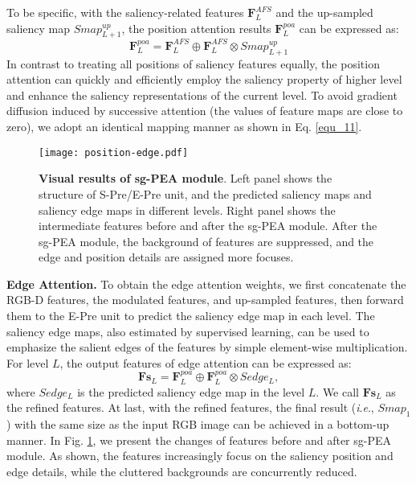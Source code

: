 \documentclass[runningheads]{llncs}
\newcommand{\ie}{\textit{i}.\textit{e}.}
\begin{document}
To be specific, with the saliency-related features $\mathbf{F}_{L}^{AFS}$ and the up-sampled saliency map $Smap_{L+1}^{up}$, the position attention results $\mathbf{F}_{L}^{poa}$ can be expressed as:
\begin{equation}
\label{equ_11}
\mathbf{F}_{L}^{poa} =\mathbf{F}_{L}^{AFS} \oplus \mathbf{F}_{L}^{AFS} \otimes Smap_{L+1}^{up}
\end{equation}
In contrast to treating all positions of saliency features equally, the position attention can quickly and efficiently employ the saliency property of higher level and enhance the  saliency representations of the current level. To avoid gradient diffusion induced by successive attention (the values of feature maps are close to zero), we adopt an identical mapping manner as shown in Eq. \eqref{equ_11}.

\begin{figure*}[!t]
	\centering
	\texttt{[image: position-edge.pdf]}
	\caption{\textbf{Visual results of sg-PEA module}. Left panel shows the structure of S-Pre/E-Pre unit, and the predicted saliency maps and saliency edge maps in different levels. Right panel shows the intermediate features before and after the sg-PEA module. After the sg-PEA module, the background of features are suppressed, and the edge and position details are assigned more focuses. }
	\label{PEA}
\end{figure*}

\noindent
\textbf{Edge Attention.}
To obtain the edge attention weights, we first concatenate the RGB-D features, the modulated features, and up-sampled features, then forward them to the E-Pre unit to predict the saliency edge map in each level. The saliency edge maps, also estimated by supervised learning, can be used to emphasize the salient edges of the features by simple element-wise multiplication. For level $L$, the output features of edge attention can be expressed as:
\begin{equation}
\label{equ_12}
\mathbf{Fs}_{L} =\mathbf{F}_{L}^{poa}\oplus \mathbf{F}_{L}^{poa} \otimes Sedge_{L},
\end{equation}
where $Sedge_{L}$ is the predicted saliency edge map in the level $L$. We call $\mathbf{Fs}_{L}$ as the refined features. At last, with the refined features, the  final result (\ie, $Smap_{1}$)  with the same size as the input RGB image can be achieved in a bottom-up manner. In Fig. \ref{PEA}, we present the changes of features before and after sg-PEA module. As shown, the features increasingly focus on the saliency position and edge details, while the cluttered backgrounds are concurrently reduced.
\end{document}
